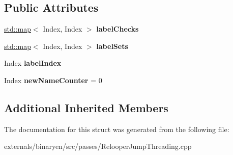 \subsection*{Public Attributes}
\begin{DoxyCompactItemize}
\item 
\mbox{\label{structwasm_1_1_relooper_jump_threading_a9c6ed87fb73e85da4538a4b8748ccc40}} 
\mbox{\hyperlink{classstd_1_1map}{std\+::map}}$<$ Index, Index $>$ {\bfseries label\+Checks}
\item 
\mbox{\label{structwasm_1_1_relooper_jump_threading_a3db187454edacd764fcbe0fe69b3dc7e}} 
\mbox{\hyperlink{classstd_1_1map}{std\+::map}}$<$ Index, Index $>$ {\bfseries label\+Sets}
\item 
\mbox{\label{structwasm_1_1_relooper_jump_threading_a4b69d6cbc6835f78f8525acd1885aff3}} 
Index {\bfseries label\+Index}
\item 
\mbox{\label{structwasm_1_1_relooper_jump_threading_a62d88e97c1c22277838851b9b6f7326e}} 
Index {\bfseries new\+Name\+Counter} = 0
\end{DoxyCompactItemize}
\subsection*{Additional Inherited Members}


The documentation for this struct was generated from the following file\+:\begin{DoxyCompactItemize}
\item 
externals/binaryen/src/passes/Relooper\+Jump\+Threading.\+cpp\end{DoxyCompactItemize}
